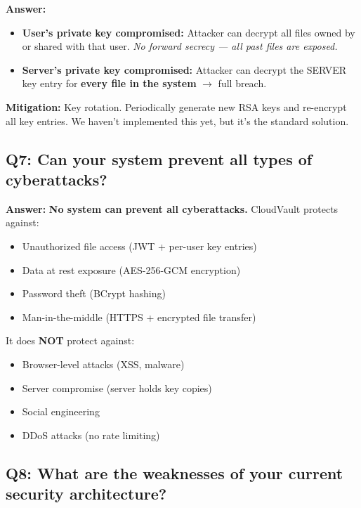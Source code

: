 \documentclass[11pt,a4paper]{article}
\begin{document}
\textbf{Answer:}
\begin{itemize}
  \item \textbf{User's private key compromised:} Attacker can decrypt all files owned by or shared with that user. \textit{No forward secrecy --- all past files are exposed.}
  \item \textbf{Server's private key compromised:} Attacker can decrypt the SERVER key entry for \textbf{every file in the system} $\rightarrow$ full breach.
\end{itemize}

\textbf{Mitigation:} Key rotation. Periodically generate new RSA keys and re-encrypt all key entries. We haven't implemented this yet, but it's the standard solution.

\subsection{Q7: Can your system prevent all types of cyberattacks?}

\textbf{Answer:} \textbf{No system can prevent all cyberattacks.} CloudVault protects against:
\begin{itemize}
  \item[$\checkmark$] Unauthorized file access (JWT + per-user key entries)
  \item[$\checkmark$] Data at rest exposure (AES-256-GCM encryption)
  \item[$\checkmark$] Password theft (BCrypt hashing)
  \item[$\checkmark$] Man-in-the-middle (HTTPS + encrypted file transfer)
\end{itemize}

It does \textbf{NOT} protect against:
\begin{itemize}
  \item[$\times$] Browser-level attacks (XSS, malware)
  \item[$\times$] Server compromise (server holds key copies)
  \item[$\times$] Social engineering
  \item[$\times$] DDoS attacks (no rate limiting)
\end{itemize}

\subsection{Q8: What are the weaknesses of your current security architecture?}
\end{document}

